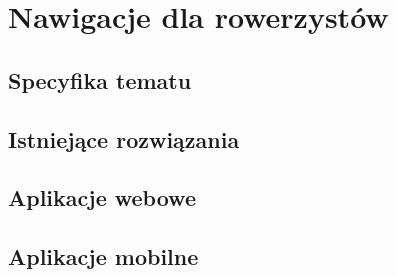 \chapter{Nawigacje dla rowerzystów}
\label{cha:nawigacje_dla_rowerzystow}

\section{Specyfika tematu}


\section{Istniejące rozwiązania}



\section{Aplikacje webowe}



\section{Aplikacje mobilne}

